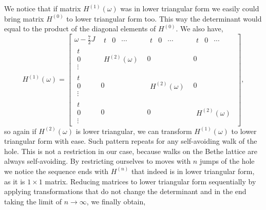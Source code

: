 \documentclass{article}
\begin{document}
We notice that if matrix $H^{(1)}(\omega)$ was in lower triangular form we easily could bring matrix $H^{(0)}$ to lower triangular form too. This way the determinant would equal to the product of the diagonal elements of $H^{(0)}$. We also have,
\begin{equation}
    H^{(1)}(\omega) =  
    \left[
    \begin{array}{c|c|c|c}
        \omega - \frac{7}{2}J & 
            \begin{array}{ccc} t & 0 & \cdots \end{array} &
            \begin{array}{ccc} t & 0 & \cdots \end{array} &
            \begin{array}{ccc} t & 0 & \cdots \end{array} \\
        \hline
        \begin{array}{c} t \\ 0 \\ \vdots \end{array} & 
            \begin{array}{c} H^{(2)}(\omega) \end{array} & 0 & 0 \\
        \hline
        \begin{array}{c} t \\ 0 \\ \vdots \end{array} & 
            0 & \begin{array}{c} H^{(2)}(\omega) \end{array} & 0  \\
        \hline
        \begin{array}{c} t \\ 0 \\ \vdots \end{array} & 
            0 & 0 &\begin{array}{c} H^{(2)}(\omega) \end{array}
    \end{array}
    \right],
\end{equation}
so again if $H^{(2)}(\omega)$ is lower triangular, we can transform $H^{(1)}(\omega)$ to lower triangular form with ease. Such pattern repeats for any self-avoiding walk of the hole. This is not a restriction in our case, because walks on the Bethe lattice are always self-avoiding. By restricting ourselves to moves with $n$ jumps of the hole we notice the sequence ends with $H^{(n)}$ that indeed is in lower triangular form, as it is $1 \times 1$ matrix. Reducing matrices to lower triangular form sequentially by applying transformations that do not change the determinant and in the end taking the limit of $n\to\infty$,  we finally obtain,
\end{document}
